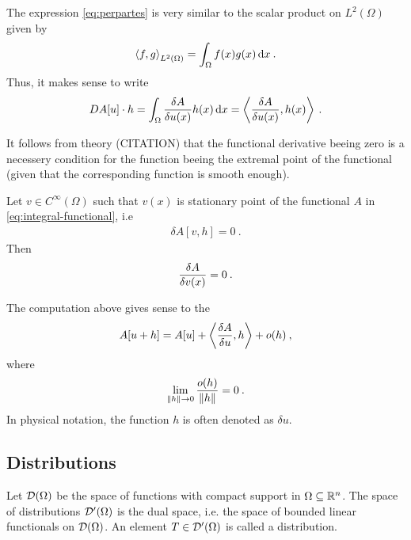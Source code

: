 The expression \eqref{eq:perpartes} is very similar to the scalar product on $L^2(\Omega)$ given by
\begin{align}
    \left \langle f ,g \right \rangle_{L^2(\Omega)} = \int_\Omega f(x) g(x) \, \mathrm{d} x \:.
\end{align}
Thus, it makes sense to write
\begin{align}
    DA[u] \cdot h = \int_\Omega \frac{\delta A}{\delta u(x)} h(x) \, \mathrm{d} x = \left \langle \frac{\delta A}{\delta u(x)} ,h(x) \right \rangle \:.
\end{align}



It follows from theory (CITATION) that the functional derivative beeing zero is a necessery condition for the function beeing the extremal point of the functional (given that the corresponding function is smooth enough).

\begin{theorem}
    Let $v \in C^\infty(\Omega)$ such that $v(x)$ is stationary point of the functional $A$ in \eqref{eq:integral-functional}, i.e
    \begin{align}
        \delta A[v,h] = 0 \:.
    \end{align}
    Then  
    \begin{align}
        \frac{\delta A}{\delta v(x)} = 0 \:.
    \end{align}
\end{theorem}

The computation above gives sense to the 
\begin{align}
    A[u+h] = A[u] + \left \langle \frac{\delta A}{\delta u} ,h \right \rangle + o(h)\:,
\end{align}
where
\begin{align}
    \lim_{\left \Vert h \right \Vert \rightarrow 0} \frac{o(h)}{\left \Vert h \right \Vert} = 0 \:.
\end{align}
In physical notation, the function $h$ is often denoted as $\delta u$.


\subsection{Distributions}

\begin{definition}[Distributions]
    Let $\mathcal{D}(\Omega)$ be the space of functions with compact support in $\Omega \subseteq \mathbb{R}^n$. The space of distributions $\mathcal{D'}(\Omega)$ is the dual space, i.e. the space of bounded linear functionals on $\mathcal{D}(\Omega)$. An element $T \in \mathcal{D'}(\Omega)$ is called a distribution.
\end{definition}

